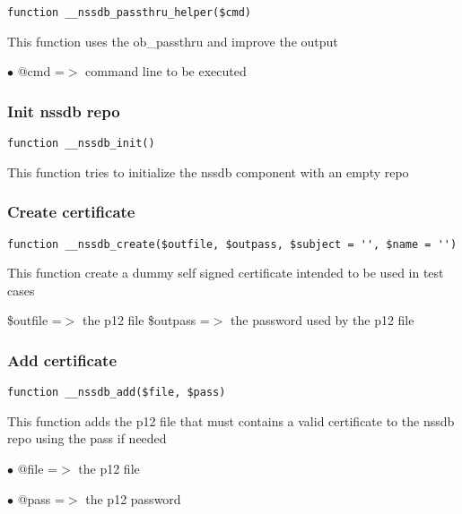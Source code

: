 \documentclass[a4paper]{article}
\begin{document}
\begin{lstlisting}
function __nssdb_passthru_helper($cmd)
\end{lstlisting}

This function uses the ob\_passthru and improve the output

\begin{compactitem}
\item[\color{myblue}$\bullet$] @cmd =$>$ command line to be executed
\end{compactitem}

\hypertarget{toc11}{}
\subsubsection{Init nssdb repo}

\begin{lstlisting}
function __nssdb_init()
\end{lstlisting}

This function tries to initialize the nssdb component with an empty repo

\hypertarget{toc12}{}
\subsubsection{Create certificate}

\begin{lstlisting}
function __nssdb_create($outfile, $outpass, $subject = '', $name = '')
\end{lstlisting}

This function create a dummy self signed certificate intended to be used in
test cases

\$outfile =$>$ the p12 file
\$outpass =$>$ the password used by the p12 file

\hypertarget{toc13}{}
\subsubsection{Add certificate}

\begin{lstlisting}
function __nssdb_add($file, $pass)
\end{lstlisting}

This function adds the p12 file that must contains a valid certificate to the
nssdb repo using the pass if needed

\begin{compactitem}
\item[\color{myblue}$\bullet$] @file =$>$ the p12 file
\item[\color{myblue}$\bullet$] @pass =$>$ the p12 password
\end{compactitem}
\end{document}
